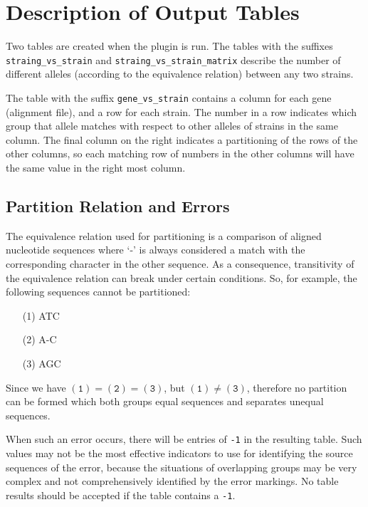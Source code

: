 \documentclass[12pt,letterpaper]{article}
\begin{document}
\newpage
\section{Description of Output Tables}
\parskip 10pt

Two tables are created when the plugin is run.  The tables with the suffixes
\texttt{straing\_vs\_strain} and \texttt{straing\_vs\_strain\_matrix}
describe the number of different alleles (according to the equivalence
relation) between any two strains.

The table with the suffix \texttt{gene\_vs\_strain} contains a column for each
gene (alignment file), and a row for each strain.  The number in a row
indicates which group that allele matches with respect to other alleles of
strains in the same column.  The final column on the right indicates a
partitioning of the rows of the other columns, so each matching row of numbers
in the other columns will have the same value in the right most column.

\subsection{Partition Relation and Errors}
The equivalence relation used for partitioning is a comparison of aligned
nucleotide sequences where `-' is always considered a match with the
corresponding character in the other sequence.  As a consequence, transitivity
of the equivalence relation can break under certain conditions.  So, for
example, the following sequences cannot be partitioned:

\parskip 0cm
\begin{enumerate}
\item[(1)] ATC
\item[(2)] A-C
\item[(3)] AGC
\end{enumerate}

\parskip 10pt

Since we have $(\texttt{1}) = (\texttt{2}) = (\texttt{3})$, but $(\texttt{1})
\ne (\texttt{3})$, therefore no partition can be formed which both groups equal
sequences and separates unequal sequences.

When such an error occurs, there will be entries of \texttt{-1} in the
resulting table.  Such values may not be the most effective indicators to use
for identifying the source sequences of the error, because the situations of
overlapping groups may be very complex and not comprehensively identified by
the error markings.  No table results should be accepted if the table contains
a \texttt{-1}.
\end{document}
